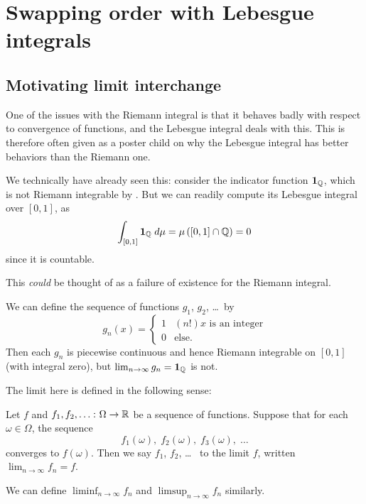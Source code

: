 \chapter{Swapping order with Lebesgue integrals}
\label{ch:swapsum_measure}
\section{Motivating limit interchange}

One of the issues with the Riemann integral is
that it behaves badly with respect to convergence of functions,
and the Lebesgue integral deals with this.
This is therefore often given as a poster child
on why the Lebesgue integral has better behaviors than the Riemann one.

We technically have already seen this:
consider the indicator function $\mathbf{1}_\mathbb Q$,
which is not Riemann integrable by .
But we can readily compute its Lebesgue integral over $[0,1]$, as
\[ \int_{[0,1]} \mathbf{1}_\mathbb Q \; d\mu
	= \mu\left( [0,1] \cap \mathbb Q \right) = 0 \]
since it is countable.

This \emph{could} be thought of as a failure of existence
for the Riemann integral.
\begin{example}
	\label{ex:1QQindicator}
	We can define the sequence of functions $g_1$, $g_2$, \dots\ by
	\[ g_n(x) = \begin{cases}
			1 & (n!)x \text{ is an integer} \\
			0 & \text{else}.
		\end{cases} \]
	Then each $g_n$ is piecewise continuous
	and hence Riemann integrable on $[0,1]$ (with integral zero),
	but $\lim_{n \to \infty} g_n = \mathbf{1}_\mathbb Q$ is not.
\end{example}

The limit here is defined in the following sense:
\begin{definition}
	Let $f$ and $f_1, f_2, \dots \colon \Omega \to \mathbb R$ be a sequence of functions.
	Suppose that for each $\omega \in \Omega$, the sequence
	\[ f_1(\omega), \; f_2(\omega), \; f_3(\omega), \; \dots \]
	converges to $f(\omega)$.
	Then we say $f_1$, $f_2$, \dots\ 
	to the limit $f$, written $\lim_{n \to \infty} f_n = f$.

	We can define $\liminf_{n \to \infty} f_n$
	and $\limsup_{n \to \infty} f_n$ similarly.
\end{definition}

